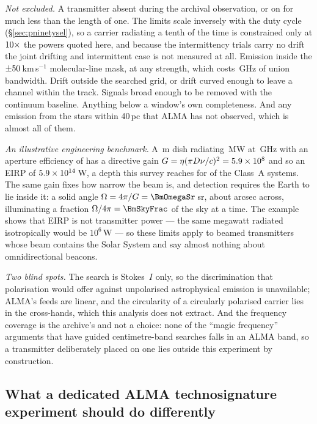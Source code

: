 \noindent\emph{Not excluded.} A transmitter absent during the archival
observation, or on for much less than the length of one. The limits scale
inversely with the duty cycle (\S\ref{sec:pninetysel}), so a carrier
radiating a tenth of the time is constrained only at $10\times$
the powers quoted here, and because the intermittency trials carry no drift
the joint drifting and intermittent case is not measured at all. Emission inside the
$\pm50$\,km\,s$^{-1}$ molecular-line mask, at any strength, which
costs \FrMaskLostGHz\,GHz of union bandwidth. Drift outside the searched grid, or
drift curved enough to leave a channel within the track. Signals broad enough
to be removed with the continuum baseline. Anything below a window's own
completeness. And any emission from the \NGaiaCensus{} stars within 40\,pc
that ALMA has not observed, which is almost all of them.

\noindent\emph{An illustrative engineering benchmark.} A \BenchDiam\,m dish
radiating \BenchPowerMW\,MW at \BenchFreqGHz\,GHz with an aperture efficiency
of \BenchEta{} has a directive gain $G=\eta(\pi D\nu/c)^{2}=5.9\times10^{8}$ and so
an EIRP of $5.9\times10^{14}$\,W, a depth this survey reaches for \BenchNSysA{} of
the \NSysClassA{} Class~A systems. The same gain fixes how narrow the beam is,
and detection requires the Earth to lie inside it: a solid angle
$\Omega=4\pi/G=\BmOmegaSr$\,sr, about \BmArcsec{} arcsec across, illuminating a
fraction $\Omega/4\pi=\BmSkyFrac$ of the sky at a time. The example shows that EIRP is not transmitter power --- the
same megawatt radiated isotropically would be $10^{6}$\,W --- so these limits
apply to beamed transmitters whose beam contains the Solar System and say
almost nothing about omnidirectional beacons.

\noindent\emph{Two blind spots.} The search is Stokes~$I$ only, so the
discrimination that polarisation would offer against unpolarised
astrophysical emission is unavailable; ALMA's feeds are linear, and the
circularity of a circularly polarised carrier lies in the cross-hands, which
this analysis does not extract. And the frequency coverage is the archive's
and not a choice: none of the ``magic frequency'' arguments that have guided
centimetre-band searches falls in an ALMA band, so a transmitter deliberately
placed on one lies outside this experiment by construction.

\subsection{What a dedicated ALMA technosignature experiment should do
differently}
\label{sec:future}

